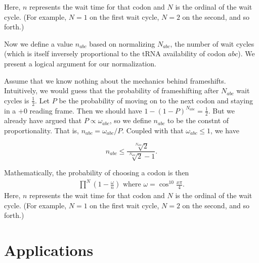 \documentclass[12pt, draft]{article}
\numberwithin{equation}{section}
\begin{document}
Here, $n$ represents the wait time for that codon and $N$ is the ordinal of the wait cycle. (For example,
$N=1$ on the first wait cycle, $N=2$ on the second, and so forth.)

Now we define a value $n_{abc}$ based on normalizing $N_{abc}$, the
number of wait cycles (which is itself inversely proportional to the
tRNA availability of codon $abc$).  We present a logical argument for
our normalization.

Assume that we know nothing about the mechanics behind frameshifts.
Intuitively, we would guess that the probability of frameshifting
after $N_{abc}$ wait cycles is $\frac{1}{2}$.  Let $P$ be the
probability of moving on to the next codon and staying in a +0 reading
frame.  Then we should have $1-\left(1-P\right)^{N_{abc}} =
\frac{1}{2}$.  But we already have argued that $P \propto
\omega_{abc}$, so we define $n_{abc}$ to be the constnt of
proportionality. That is, $n_{abc} = \omega_{abc} / P$.  Coupled
with that $\omega_{abc} \le 1$, we have

\begin{equation}
  n_{abc} \le \frac{\sqrt[N_{abc}]{2}}{\sqrt[N_{abc}]{2} - 1}.
\end{equation}

Mathematically, the probability of choosing a codon is then
\begin{align}
  \prod^N \left(1-\frac{\omega}{n}\right) \text{ where } \omega = \cos^{10}{\frac{x\pi}{4}}.
\end{align}
Here, $n$ represents the wait time for that codon and $N$ is the ordinal of the wait cycle. (For example,
$N=1$ on the first wait cycle, $N=2$ on the second, and so forth.)

\section{Applications}
\end{document}

